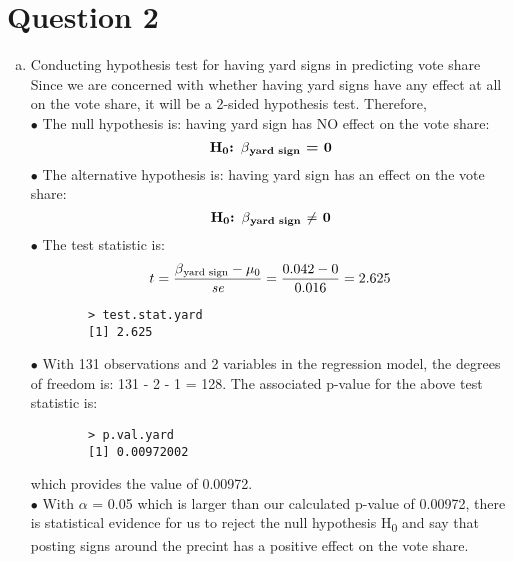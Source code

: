 \documentclass[12pt,letterpaper]{article}
\begin{document}
	\section{Question 2}
	\begin{enumerate} [(a)]
		\item Conducting hypothesis test for having yard signs in predicting vote share \\
		Since we are concerned with whether having yard signs have any effect at all on the vote share, it will be a 2-sided hypothesis test. Therefore, \\
		$\bullet$ The null hypothesis is: having yard sign has NO effect on the vote share:
			$${\textbf{H\textsubscript{0}: $\beta\textsubscript{yard sign}$ = 0}}$$
		$\bullet$ The alternative hypothesis is: having yard sign has an effect on the vote share:
			$${\textbf{H\textsubscript{0}: $\beta\textsubscript{yard sign}$ $\neq$ 0}}$$
		$\bullet$ The test statistic is:
		$${t = \frac{\beta\textsubscript{yard sign}	 - \mu\textsubscript{0}}{\textit{se}}} = \frac{0.042 - 0}{0.016} = 2.625 $$
		
		\begin{verbatim}
		> test.stat.yard
		[1] 2.625
		\end{verbatim}
		$\bullet$ With 131 observations and 2 variables in the regression model, the degrees of freedom is: 131 - 2 - 1 = 128. The associated p-value for the above test statistic is:
		
		\begin{verbatim}
		> p.val.yard
		[1] 0.00972002
		\end{verbatim}
		which provides the value of 0.00972. \\
		$\bullet$ With $\alpha$ = 0.05 which is larger than our calculated p-value of 0.00972, there is statistical evidence for us to reject the null hypothesis H\textsubscript{0} and say that posting signs around the precint has a positive effect on the vote share. 
		

\end{enumerate}
\end{document}
